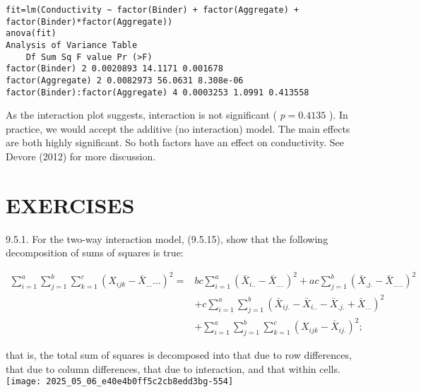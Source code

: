 \begin{verbatim}
fit=lm(Conductivity ~ factor(Binder) + factor(Aggregate) +
factor(Binder)*factor(Aggregate))
anova(fit)
Analysis of Variance Table
    Df Sum Sq F value Pr (>F)
factor(Binder) 2 0.0020893 14.1171 0.001678
factor(Aggregate) 2 0.0082973 56.0631 8.308e-06
factor(Binder):factor(Aggregate) 4 0.0003253 1.0991 0.413558
\end{verbatim}

As the interaction plot suggests, interaction is not significant ( $p=0.4135$ ). In practice, we would accept the additive (no interaction) model. The main effects are both highly significant. So both factors have an effect on conductivity. See Devore (2012) for more discussion.

\section*{EXERCISES}
9.5.1. For the two-way interaction model, (9.5.15), show that the following decomposition of sums of squares is true:

$$
\begin{aligned}
\sum_{i=1}^{a} \sum_{j=1}^{b} \sum_{k=1}^{c}\left(X_{i j k}-\bar{X}_{\ldots} \ldots\right)^{2}= & b c \sum_{i=1}^{a}\left(\bar{X}_{i . .}-\bar{X}_{\ldots .}\right)^{2}+a c \sum_{j=1}^{b}\left(\bar{X}_{. j .}-\bar{X}_{\ldots . .}\right)^{2} \\
& +c \sum_{i=1}^{a} \sum_{j=1}^{b}\left(\bar{X}_{i j .}-\bar{X}_{i . .}-\bar{X}_{. j .}+\bar{X}_{\ldots}\right)^{2} \\
& +\sum_{i=1}^{a} \sum_{j=1}^{b} \sum_{k=1}^{c}\left(X_{i j k}-\bar{X}_{i j .}\right)^{2} ;
\end{aligned}
$$

that is, the total sum of squares is decomposed into that due to row differences, that due to column differences, that due to interaction, and that within cells.\\
\texttt{[image: 2025\_05\_06\_e40e4b0ff5c2cb8edd3bg-554]}

